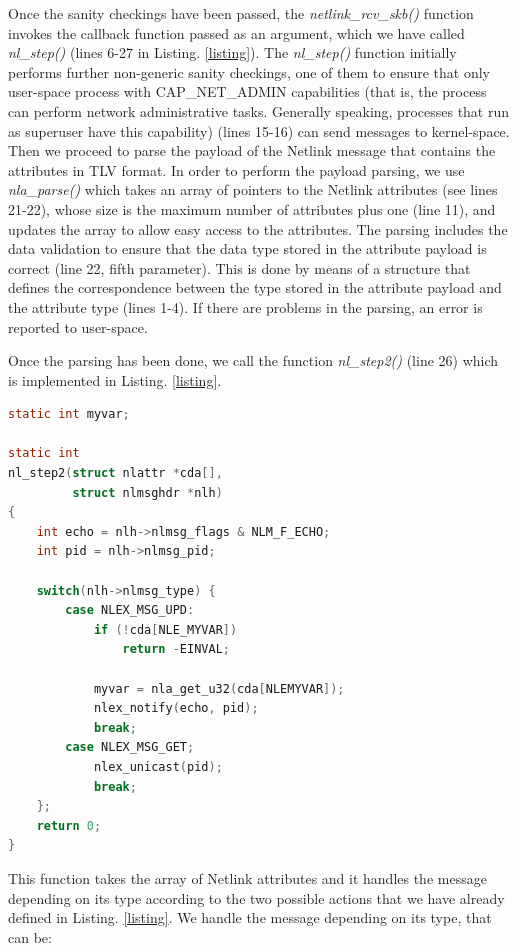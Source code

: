 \documentclass[10pt,onecolumn]{article}
\begin{document}
Once the sanity checkings have been passed, the \textit{netlink\_rcv\_skb()} function invokes the callback function passed as an argument, which we have called \textit{nl\_step()} (lines 6-27 in Listing. \ref{listing}). The \textit{nl\_step()} function initially performs further non-generic sanity checkings, one of them to ensure that only user-space process with CAP\_NET\_ADMIN capabilities (that is, the process can perform network administrative tasks. Generally speaking, processes that run as superuser have this capability) (lines 15-16) can send messages to kernel-space. Then we proceed to parse the payload of the Netlink message that contains the attributes in TLV format. In order to perform the payload parsing, we use \textit{nla\_parse()} which takes an array of pointers to the Netlink attributes (see lines 21-22), whose size is the maximum number of attributes plus one (line 11), and updates the array to allow easy access to the attributes. The parsing includes the data validation to ensure that the data type stored in the attribute payload is correct (line 22, fifth parameter). This is done by means of a structure that defines the correspondence between the type stored in the attribute payload and the attribute type (lines 1-4). If there are problems in the parsing, an error is reported to user-space.

Once the parsing has been done, we call the function \textit{nl\_step2()} (line 26) which is implemented in Listing. \ref{listing}.

\begin{lstlisting}[language=C, caption=nl\_step2() function, label=listing3]
static int myvar;

static int
nl_step2(struct nlattr *cda[],
         struct nlmsghdr *nlh)
{
    int echo = nlh->nlmsg_flags & NLM_F_ECHO;
    int pid = nlh->nlmsg_pid;

    switch(nlh->nlmsg_type) {
        case NLEX_MSG_UPD:
            if (!cda[NLE_MYVAR])
                return -EINVAL;

            myvar = nla_get_u32(cda[NLEMYVAR]);
            nlex_notify(echo, pid);
            break;
        case NLEX_MSG_GET;
            nlex_unicast(pid);
            break;
    };
    return 0;
}
\end{lstlisting}

This function takes the array of Netlink attributes and it handles the message depending on its type according to the two possible actions that we have already defined in Listing. \ref{listing}. We handle the message depending on its type, that can be:
\end{document}

